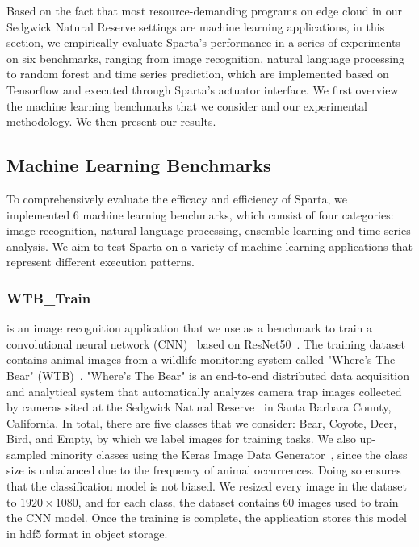 Based on the fact that most resource-demanding programs on edge cloud in our Sedgwick Natural Reserve settings are machine learning applications, in this section, we empirically evaluate Sparta's performance in a series of experiments on six benchmarks, ranging from image recognition, natural language processing to random forest and time series prediction, which are implemented based on Tensorflow and executed through Sparta's actuator interface. We first overview the machine learning benchmarks that we consider and our experimental methodology. We then present our results.

\subsection{Machine Learning Benchmarks}

To comprehensively evaluate the efficacy and efficiency of Sparta, we implemented 6 machine learning benchmarks, which consist of four categories: image recognition, natural language processing, ensemble learning and time series analysis. We aim to test Sparta on a variety of machine learning applications that represent different execution patterns.

\subsubsection{WTB\_Train}

is an image recognition application that we use as a benchmark to train a convolutional neural network (CNN)~\cite{ref:cnn} based on ResNet50~\cite{ref:resnet}. The training dataset contains animal images from a wildlife monitoring system called "Where's The Bear" (WTB)~\cite{ref:wtb}. "Where's The Bear" is an end-to-end distributed data acquisition and analytical system that automatically analyzes camera trap images collected by cameras sited at the Sedgwick Natural Reserve~\cite{ref:sedgwick} in Santa Barbara County, California. In total, there are five classes that we consider: Bear, Coyote, Deer, Bird, and Empty, by which we label images for training tasks. We also up-sampled minority classes using the Keras Image Data Generator~\cite{ref:datagen}, since the class size is unbalanced due to the frequency of animal occurrences. Doing so ensures that the classification model is not biased. We resized every image in the dataset to $1920 \times 1080$, and for each class, the dataset contains 60 images used to train the CNN model. Once the training is complete, the application stores this model in hdf5 format in object storage. 

